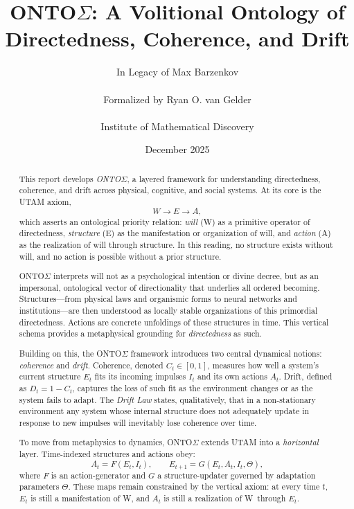 \documentclass[12pt,a4paper]{report}
\title{\texorpdfstring{ONTO$\Sigma$: A Volitional Ontology of Directedness, Coherence, and Drift}
                     {ONTOS: A Volitional Ontology of Directedness, Coherence, and Drift}}
\author{\LARGE{In Legacy of Max Barzenkov}\\ \\
Formalized by Ryan O. van Gelder \\ \\
\small Institute of Mathematical Discovery}
\date{December 2025}
\newcommand{\Will}{W}
\newcommand{\Struct}{E}
\newcommand{\Act}{A}
\newcommand{\Ct}{C_t}
\newcommand{\Dt}{D_t}
\begin{document}
\maketitle
\thispagestyle{empty}
\clearpage


\begin{abstract}
This report develops \emph{ONTO$\Sigma$}, a layered framework for understanding directedness, coherence, and drift across physical, cognitive, and social systems. At its core is the UTAM axiom,
\[
    \Will \to \Struct \to \Act,
\]
which asserts an ontological priority relation: \emph{will} (\Will) as a primitive operator of directedness, \emph{structure} (\Struct) as the manifestation or organization of will, and \emph{action} (\Act) as the realization of will through structure. In this reading, no structure exists without will, and no action is possible without a prior structure.

ONTO$\Sigma$ interprets will not as a psychological intention or divine decree, but as an impersonal, ontological vector of directionality that underlies all ordered becoming. Structures---from physical laws and organismic forms to neural networks and institutions---are then understood as locally stable organizations of this primordial directedness. Actions are concrete unfoldings of these structures in time. This vertical schema provides a metaphysical grounding for \emph{directedness} as such.

Building on this, the ONTO$\Sigma$ framework introduces two central dynamical notions: \emph{coherence} and \emph{drift}. Coherence, denoted \(\Ct \in [0,1]\), measures how well a system's current structure \(\Struct_t\) fits its incoming impulses \(I_t\) and its own actions \(\Act_t\). Drift, defined as \( \Dt = 1 - \Ct \), captures the loss of such fit as the environment changes or as the system fails to adapt. The \emph{Drift Law} states, qualitatively, that in a non-stationary environment any system whose internal structure does not adequately update in response to new impulses will inevitably lose coherence over time.

To move from metaphysics to dynamics, ONTO$\Sigma$ extends UTAM into a \emph{horizontal} layer. Time-indexed structures and actions obey:
\[
    \Act_t = F(\Struct_t, I_t), \qquad
    \Struct_{t+1} = G(\Struct_t, \Act_t, I_t, \Theta),
\]
where \(F\) is an action-generator and \(G\) a structure-updater governed by adaptation parameters \(\Theta\). These maps remain constrained by the vertical axiom: at every time \(t\), \(\Struct_t\) is still a manifestation of \Will, and \(\Act_t\) is still a realization of \Will\ through \(\Struct_t\).


\end{abstract}
\end{document}
